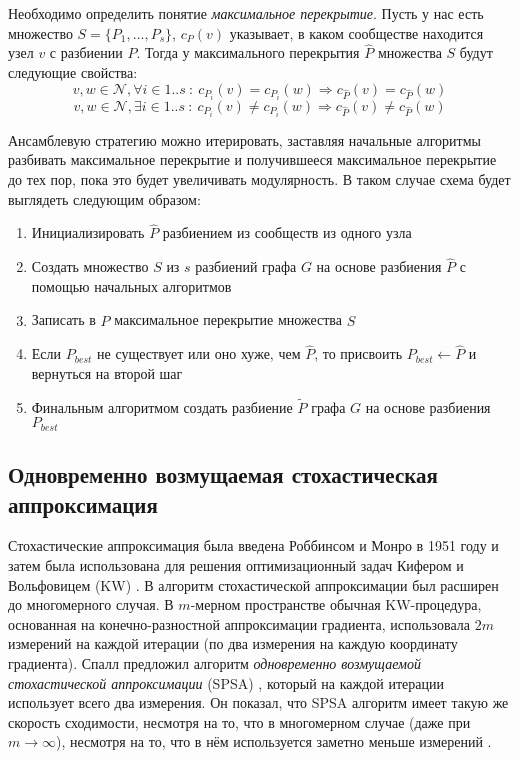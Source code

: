 \documentclass{matmex-diploma}
\begin{document}
Необходимо определить понятие \emph{максимальное перекрытие}. Пусть у нас есть множество $S = \{P_1, \dots, P_s\}$, $c_P(v)$ указывает, в каком сообществе находится узел $v$ с разбиении $P$.
Тогда у максимального перекрытия $\hat{P}$ множества $S$ будут следующие свойства:
$$v, w \in \mathscr{N}, \forall i \in 1..s\ :\ c_{P_i}(v) = c_{P_i}(w) \Rightarrow c_{\hat{P}}(v) = c_{\hat{P}}(w)$$
$$v, w \in \mathscr{N}, \exists i \in 1..s\ :\ c_{P_i}(v) \ne c_{P_i}(w) \Rightarrow c_{\hat{P}}(v) \ne c_{\hat{P}}(w)$$

Ансамблевую стратегию можно итерировать, заставляя начальные алгоритмы разбивать максимальное перекрытие и получившееся максимальное перекрытие до тех пор, пока это будет увеличивать модулярность. В таком случае схема будет выглядеть следующим образом:

\begin{enumerate}
	\item Инициализировать $\hat{P}$ разбиением из сообществ из одного узла
	\item Создать множество $S$ из $s$ разбиений графа $G$ на основе разбиения $\hat{P}$ с помощью начальных алгоритмов
	\item Записать в $\hat{P}$ максимальное перекрытие множества $S$
	\item Если $P_{best}$ не существует или оно хуже, чем $\hat{P}$, то присвоить $P_{best} \leftarrow \hat{P}$ и вернуться на второй шаг
	\item Финальным алгоритмом создать разбиение $\widetilde{P}$ графа $G$ на основе разбиения $P_{best}$ 
\end{enumerate}

\subsection{Одновременно возмущаемая стохастическая аппроксимация}
Стохастические аппроксимация была введена Роббинсом и Монро в 1951 году \cite{Robbins&Monro:1951} и затем была использована для решения оптимизационный задач Кифером и Вольфовицем (KW) \cite{Kiefer&Wolfowitz:1952}. В \cite{Blum:1954} алгоритм стохастической аппроксимации был расширен до многомерного случая. В $m$-мерном пространстве обычная KW-процедура, основанная на конечно-разностной аппроксимации градиента, использовала $2m$ измерений на каждой итерации (по два измерения на каждую координату градиента). Спалл предложил алгоритм \emph{одновременно возмущаемой стохастической аппроксимации} (SPSA) \cite{Spall:1992}, который на каждой итерации использует всего два измерения. Он показал, что SPSA алгоритм имеет такую же скорость сходимости, несмотря на то, что в многомерном случае (даже при $m \to \infty$), несмотря на то, что в нём используется заметно меньше измерений \cite{Spall:2005}.
\end{document}
